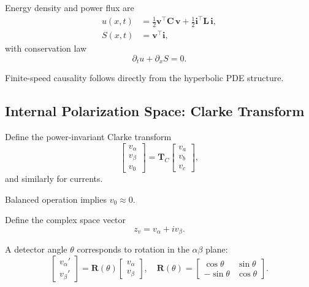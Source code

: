Energy density and power flux are
\begin{align}
u(x,t) &= \frac{1}{2}\mathbf v^\top \mathbf C\, \mathbf v + \frac{1}{2}\mathbf i^\top \mathbf L\, \mathbf i, \\
S(x,t) &= \mathbf v^\top \mathbf i,
\end{align}
with conservation law
\begin{equation}
\partial_t u + \partial_x S = 0.
\end{equation}

Finite-speed causality follows directly from the hyperbolic PDE structure.

\subsection{Internal Polarization Space: Clarke Transform}

Define the power-invariant Clarke transform
\begin{equation}
\begin{bmatrix}
v_\alpha \\
v_\beta \\
v_0
\end{bmatrix}
= \mathbf T_C
\begin{bmatrix}
v_a \\
v_b \\
v_c
\end{bmatrix},
\end{equation}
and similarly for currents.

Balanced operation implies $v_0 \approx 0$.

Define the complex space vector
\begin{equation}
z_v = v_\alpha + i v_\beta.
\end{equation}

A detector angle $\theta$ corresponds to rotation in the $\alpha\beta$ plane:
\begin{equation}
\begin{bmatrix}
v_\alpha' \\
v_\beta'
\end{bmatrix}
=
\mathbf R(\theta)
\begin{bmatrix}
v_\alpha \\
v_\beta
\end{bmatrix},
\quad
\mathbf R(\theta)
=
\begin{bmatrix}
\cos\theta & \sin\theta \\
-\sin\theta & \cos\theta
\end{bmatrix}.
\end{equation}

